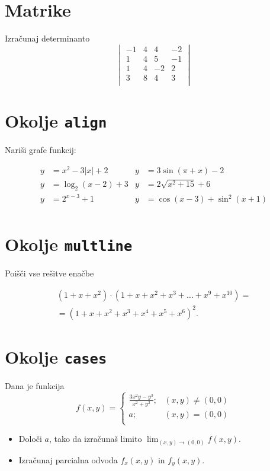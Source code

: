 \documentclass[a4paper,12pt]{article}
\begin{document}
\section*{Matrike}
Izračunaj determinanto
\[
\begin{vmatrix}
   -1 & 4 & 4 & -2 \\
   1 & 4 & 5 & -1 \\
   1 & 4 & -2 & 2 \\
   3 & 8 & 4 & 3 \\
\end{vmatrix}
\]

\section*{Okolje \texttt{align}}
Nariši grafe funkcij:

\begin{align*}
   y &= x^2 - 3|x| + 2    &y &= 3 \sin(\pi+x) - 2 \\
   y &= \log_2(x-2) + 3   &y &= 2 \sqrt{x^2+15} + 6 \\
   y &= 2^{x-3} + 1       &y &= \cos(x-3) + \sin^2(x+1) \\
\end{align*}

\section*{Okolje \texttt{multline}}
Poišči vse rešitve enačbe

\begin{multline*}
   (1+x+x^2) \cdot (1+x+x^2+x^3+\ldots+x^9+x^{10}) = \\
   =(1+x+x^2+x^3+x^4+x^5+x^6)^2.
\end{multline*}

\section*{Okolje \texttt{cases}}
Dana je funkcija
\[
   f(x,y) = 
   \begin{cases}
      \frac{3x^2y-y^3}{x^2+y^2}; &(x,y) \neq (0,0) \\
      a; &(x,y) = (0,0) \\
   \end{cases}
\]
   
\begin{itemize}
\item Določi \(a\), tako da izračunaš limito \( \lim_{(x,y)\to(0,0)} f(x,y) \).
\item Izračunaj parcialna odvoda \(f_x(x,y)\) in \(f_y(x,y)\).
\end{itemize}
\end{document}
